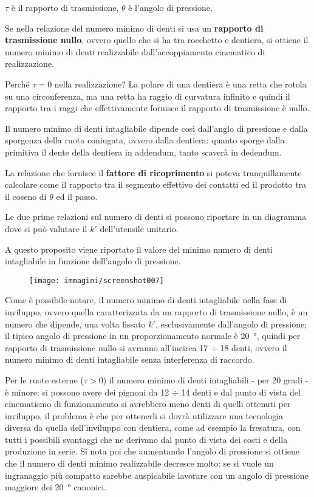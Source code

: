 \documentclass[a4paper, 15pt]{article}
\begin{document}
\begin{adjustwidth}{2in}{}
		$\tau$ è il rapporto di trasmissione, $\theta$ è l'angolo di pressione. \newline
		
		Se nella relazione del numero minimo di denti si usa un \textbf{rapporto di trasmissione nullo}, ovvero quello che si ha tra rocchetto e dentiera, si ottiene il numero minimo di denti realizzabile dall'accoppiamento cinematico di realizzazione.
		
		Perché $\tau=0$ nella realizzazione? La polare di una dentiera è una retta che rotola su una circonferenza, ma una retta ha raggio di curvatura infinito e quindi il rapporto tra i raggi che effettivamente fornisce il rapporto di trasmissione è nullo.
		
		Il numero minimo di denti intagliabile dipende così dall'anglo di pressione e dalla sporgenza della ruota coniugata, ovvero dalla dentiera: quanto sporge dalla primitiva il dente della dentiera in addendum, tanto scaverà in dedendum. \newline
		
		La relazione che fornisce il \textbf{fattore di ricoprimento} si poteva tranquillamente calcolare come il rapporto tra il segmento effettivo dei contatti ed il prodotto tra il coseno di $\theta$ ed il passo. \newline 
		
		Le due prime relazioni sul numero di denti si possono riportare in un diagramma dove si può valutare il $k'$ dell'utensile unitario. 
		
		A questo proposito viene riportato il valore del minimo numero di denti intagliabile in funzione dell'angolo di pressione.
		\begin{figure}[H]
			\centering
			\texttt{[image: immagini/screenshot007]}
			\label{fig:screenshot007}
		\end{figure}		
		Come è possibile notare, il numero minimo di denti intagliabile nella fase di inviluppo, ovvero quella caratterizzata da un rapporto di trasmissione nullo, è un numero che dipende, una volta fissato $k'$, esclusivamente dall'angolo di pressione; il tipico angolo di pressione in un proporzionamento normale è \SI{20}{\degree}, quindi per rapporto di trasmissione nullo si avranno all'incirca 17 $\div$ 18 denti, ovvero il numero minimo di denti intagliabile senza interferenza di raccordo. 

		Per le ruote esterne ($\tau>0$) il numero minimo di denti intagliabili - per 20 gradi - è minore: si possono avere dei pignoni da 12 $\div$ 14 denti e dal punto di vista del cinematismo di funzionamento si avrebbero meno denti di quelli ottenuti per inviluppo, il problema è che per ottenerli si dovrà utilizzare una tecnologia diversa da quella dell'inviluppo con dentiera, come ad esempio la fresatura, con tutti i possibili svantaggi che ne derivano dal punto di vista dei costi e della produzione in serie.
		\newpage 
		Si nota poi che aumentando l'angolo di pressione si ottiene che il numero di denti minimo realizzabile decresce molto: se si vuole un ingranaggio più compatto sarebbe auspicabile lavorare con un angolo di pressione maggiore dei \SI{20}{\degree} canonici.
		

\end{adjustwidth}
\end{document}
